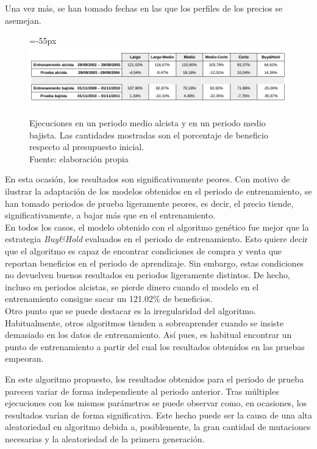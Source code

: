 Una vez m\'as, se han tomado fechas en las que los perfiles de los precios se asemejan. \\

     	\begin{figure}[H]
     		\centering\leftskip=-55px
     		\includegraphics[scale=0.60]{imagenes/Medium_period.png}
     		\caption[Ejecuciones en un periodo medio alcista y en un periodo medio bajista]{Ejecuciones en un periodo medio alcista y en un periodo medio bajista. Las cantidades mostradas son el porcentaje de beneficio respecto al presupuesto inicial.\\ Fuente: elaboraci\'on propia}
     		\label{fig:medium_period}
     	\end{figure}
     	
En esta ocasi\'on, los resultados son significativamente peores. Con motivo de ilustrar la adaptaci\'on de los modelos obtenidos en el periodo de entrenamiento, se han tomado periodos de prueba ligeramente peores, es decir, el precio tiende, significativamente, a bajar m\'as que en el entrenamiento.\\

En todos los casos, el modelo obtenido con el algoritmo gen\'etico fue mejor que la estrategia \textit{Buy\&Hold} evaluados en el periodo de entrenamiento. Esto quiere decir que el algoritmo es capaz de encontrar condiciones de compra y venta que reportan beneficios en el periodo de aprendizaje. Sin embargo, estas condiciones no devuelven buenos resultados en periodos ligeramente distintos. De hecho, incluso en periodos alcistas, se pierde dinero cuando el modelo en el entrenamiento consigue sacar un 121.02\% de beneficios.\\

Otro punto que se puede destacar es la irregularidad del algoritmo. Habitualmente, otros algoritmos tienden a sobreaprender cuando se insiste demasiado en los datos de entrenamiento. As\'i pues, es habitual encontrar un punto de entrenamiento a partir del cual los resultados obtenidos en las pruebas empeoran.

En este algoritmo propuesto, los resultados obtenidos  para el periodo de prueba parecen variar de forma independiente al periodo anterior. Tras m\'ultiples ejecuciones con los mismos par\'ametros se puede observar como, en ocasiones, los resultados var\'ian de forma significativa. Este hecho puede ser la causa de una alta aleatoriedad en algoritmo debida a, posiblemente, la gran cantidad de mutaciones necesarias y la aleatoriedad de la primera generaci\'on.

